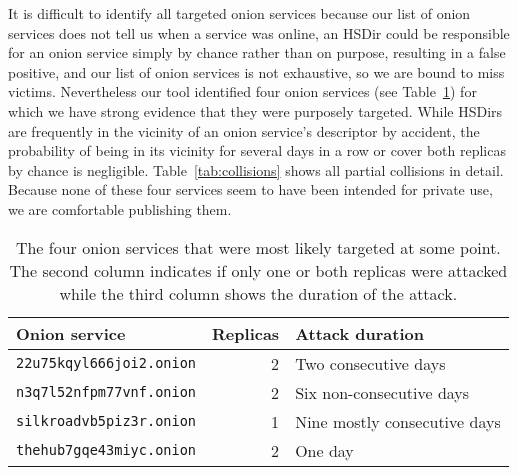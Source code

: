 It is difficult to identify all targeted onion services because \first our list
of onion services does not tell us when a service was online, \second an HSDir
could be responsible for an onion service simply by chance rather than on
purpose, resulting in a false positive, and \third our list of onion services is
not exhaustive, so we are bound to miss victims.  Nevertheless our tool
identified four onion services (see Table~\ref{tab:targeted}) for which we have
strong evidence that they were purposely targeted.  While HSDirs are frequently
in the vicinity of an onion service's descriptor by accident, the probability of
being in its vicinity for several days in a row or cover both replicas by chance
is negligible.  Table~\ref{tab:collisions} shows all partial collisions in
detail.  Because none of these four services seem to have been intended for
private use, we are comfortable publishing them.

\begin{table}[t]
	\caption{The four onion services that were most likely targeted at some
	point.  The second column indicates if only one or both replicas were
	attacked while the third column shows the duration of the attack.}
	\label{tab:targeted}
	\centering
	\begin{tabular}{l r l}
	\toprule
	Onion service & Replicas & Attack duration \\
	\midrule
	\texttt{22u75kqyl666joi2.onion} & 2 & Two consecutive days \\
	\texttt{n3q7l52nfpm77vnf.onion} & 2 & Six non-consecutive days \\
	\texttt{silkroadvb5piz3r.onion} & 1 & Nine mostly consecutive days \\
	\texttt{thehub7gqe43miyc.onion} & 2 & One day \\
	\bottomrule
	\end{tabular}
\end{table}

